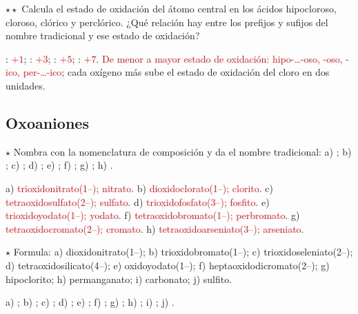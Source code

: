 \begin{exercise}
    \(\star\star\) Calcula el estado de oxidación del átomo central en los ácidos hipocloroso, cloroso, clórico y perclórico. ¿Qué
    relación hay entre los prefijos y sufijos del nombre tradicional y ese estado de oxidación?
    \begin{solu}
        : \textcolor{red}{\(+1\)}; : \textcolor{red}{\(+3\)}; : \textcolor{red}{\(+5\)}; :
        \textcolor{red}{\(+7\)}. \textcolor{red}{De menor a mayor estado de oxidación: hipo-…-oso, -oso, -ico, per-…-ico}; cada
        oxígeno más sube el estado de oxidación del cloro en dos unidades.
    \end{solu}
\end{exercise}

\subsection{Oxoaniones}

\begin{exercise}
    \(\star\) Nombra con la nomenclatura de composición y da el nombre tradicional: a) ; b) ; c) ;
    d) ; e) ; f) ; g) ; h) .
    \begin{solu}
        a) \textcolor{red}{trioxidonitrato(1\nobreakdash--); nitrato}. b) \textcolor{red}{dioxidoclorato(1\nobreakdash--); clorito}. c)
        \textcolor{red}{tetraoxidosulfato(2\nobreakdash--); sulfato}. d) \textcolor{red}{trioxidofosfato(3\nobreakdash--); fosfito}. e)
        \textcolor{red}{trioxidoyodato(1\nobreakdash--); yodato}. f) \textcolor{red}{tetraoxidobromato(1\nobreakdash--); perbromato}. g)
        \textcolor{red}{tetraoxidocromato(2\nobreakdash--); cromato}. h) \textcolor{red}{tetraoxidoarseniato(3\nobreakdash--); arseniato}.
    \end{solu}
\end{exercise}

\begin{exercise}
    \(\star\) Formula: a) dioxidonitrato(1\nobreakdash--); b) trioxidobromato(1\nobreakdash--); c) trioxidoseleniato(2\nobreakdash--); d) tetraoxidosilicato(4\nobreakdash--);
    e) oxidoyodato(1\nobreakdash--); f) heptaoxidodicromato(2\nobreakdash--); g) hipoclorito; h) permanganato; i) carbonato; j) sulfito.
    \begin{solu}
        a) \textcolor{red}{}; b) \textcolor{red}{}; c) \textcolor{red}{}; d)
        \textcolor{red}{}; e) \textcolor{red}{}; f) \textcolor{red}{}; g)
        \textcolor{red}{}; h) \textcolor{red}{}; i) \textcolor{red}{}; j) \textcolor{red}{}.
    \end{solu}
\end{exercise}

